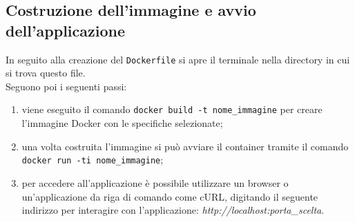 \subsection{Costruzione dell'immagine e avvio dell'applicazione}
In seguito alla creazione del \texttt{Dockerfile} si apre il terminale nella directory in cui si trova questo file.\\
Seguono poi i seguenti passi:
\begin{enumerate}
\item viene eseguito il comando \texttt{docker build -t nome\_immagine} per creare l'immagine Docker con le specifiche selezionate;
\item una volta costruita l'immagine si può avviare il container tramite il comando \texttt{docker run -ti nome\_immagine}; 
\item per accedere all'applicazione è possibile utilizzare un browser o un'applicazione da riga di comando come cURL, digitando il seguente indirizzo per interagire con l'applicazione: \textit{http://localhost:porta\_scelta}.
\end{enumerate}




